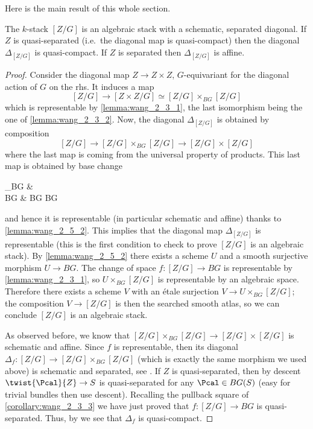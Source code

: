             Here is the main result of this whole section.
            \begin{thm}
                \label{thm:wang_2_0_2}
                The $k$-stack $[Z/G]$ is an algebraic stack with a schematic, separated diagonal. If $Z$ is quasi-separated (i.e.\ the diagonal map is quasi-compact) then the diagonal $\Delta_{[Z/G]}$ is quasi-compact. If $Z$ is separated then $\Delta_{[Z/G]}$ is affine.
            \end{thm}
            \begin{proof}
                Consider the diagonal map $Z \to Z \times Z$, $G$-equivariant for the diagonal action of $G$ on the rhs. It induces a map \[[Z/G] \to [Z \times Z/G] \simeq [Z/G] \times_{BG} [Z/G] \] which is representable by \cref{lemma:wang_2_3_1}, the last isomorphism being the one of \cref{lemma:wang_2_3_2}. Now, the diagonal $\Delta_{[Z/G]}$ is obtained by composition \[[Z/G] \to [Z/G] \times_{BG} [Z/G] \to [Z/G] \times [Z/G] \] where the last map is coming from the universal property of products. This last map is obtained by base change 
                \begin{diag}
                    \left[Z / G\right] \times_{BG} \left[ Z/ G \right] \ar[d] \ar[r] & \left[Z / G \right] \times \left[ Z / G \right] \ar[d] \\
                    BG \ar[r, "\Delta_{BG}"] & BG \times BG
                \end{diag}
                and hence it is representable (in particular schematic and affine) thanks to \cref{lemma:wang_2_5_2}. This implies that the diagonal map $\Delta_{[Z/G]}$ is representable (this is the first condition to check to prove $[Z/G]$ is an algebraic stack).
                By \cref{lemma:wang_2_5_2} there exists a scheme $U$ and a smooth surjective morphism $U \to BG$. The change of space $f\colon [Z/G] \to BG$ is representable by \cref{lemma:wang_2_3_1}, so $U \times_{BG} [Z/G]$ is representable by an algebraic space. Therefore there exists a scheme $V$ with an étale surjection $V \to U \times_{BG} [Z/G]$; the composition $V \to [Z/G]$ is then the searched smooth atlas, so we can conclude $[Z/G]$ is an algebraic stack.

                As observed before, we know that $[Z/G] \times_{BG} [Z/G] \to [Z/G] \times [Z/G]$ is schematic and affine. Since $f$ is representable, then its diagonal $\Delta_f\colon [Z/G] \to [Z/G] \times_{BG} [Z/G]$ (which is exactly the same morphism we used above) is schematic and separated, see \cite[\href{https://stacks.math.columbia.edu/tag/04YQ}{Lemma~04YQ}]{stacks-project}. If $Z$ is quasi-separated, then by descent $\twist{\Pcal}{Z} \to S$ is quasi-separated for any $\Pcal \in BG(S)$ (easy for trivial bundles then use descent). Recalling the pullback square of \cref{corollary:wang_2_3_3} we have just proved that $f\colon [Z/G] \to BG$ is quasi-separated. Thus, by \cite[\href{https://stacks.math.columbia.edu/tag/04YT}{Lemma~04YT}]{stacks-project} we see that $\Delta_f$ is quasi-compact. 


\end{proof}
